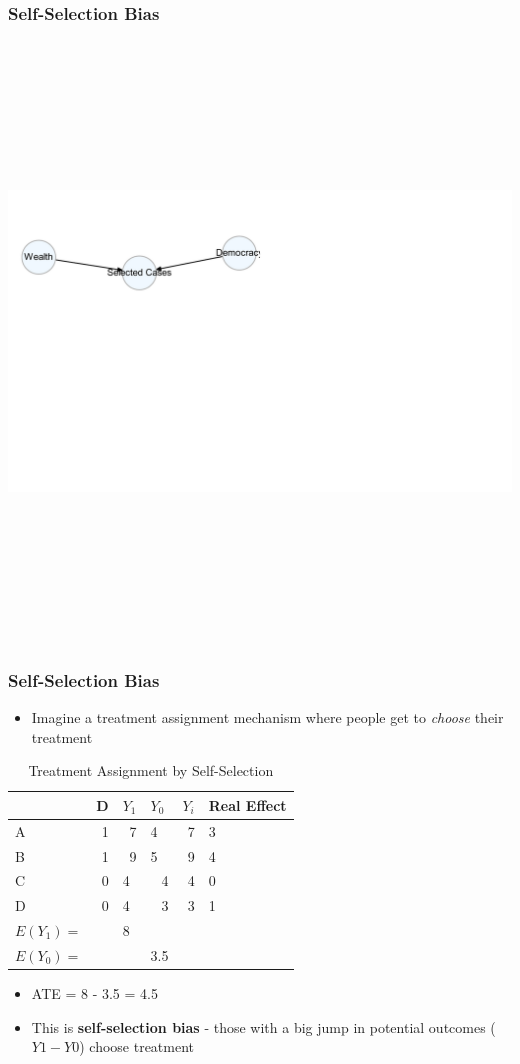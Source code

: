\documentclass[xcolor=x11names,compress]{beamer}\usepackage[]{graphicx}\usepackage[]{color}
\newenvironment{knitrout}{}{} %
\renewcommand{\(}{\begin{columns}}
\renewcommand{\)}{\end{columns}}
\newcommand{\<}[1]{\begin{column}{#1}}
\renewcommand{\>}{\end{column}}
\begin{document}
\begin{frame}
\frametitle{Self-Selection Bias}
\begin{knitrout}
\color{fgcolor}

{\centering \includegraphics[width=600,height=600]{figure/unnamed-chunk-4-1} 

}



\end{knitrout}
\end{frame}


\begin{frame}
\frametitle{Self-Selection Bias}
\begin{itemize}
\item Imagine a treatment assignment mechanism where people get to \textit{choose} their treatment
\end{itemize}
\begin{table}[htbp]
  \centering
  \caption{Treatment Assignment by Self-Selection}
    \begin{tabular}{|l|r|l|r|r|l|}
    \hline
          & \multicolumn{1}{l|}{D} & $Y_1$  & \multicolumn{1}{l|}{$Y_0$} & \multicolumn{1}{l|}{$Y_i$} & Real Effect \bigstrut\\
    \hline
    A     & 1     & \multicolumn{1}{r|}{\cellcolor{teal}7} & \multicolumn{1}{l|}{4} & 7     & 3 \bigstrut\\
    \hline
    B     & 1     & \multicolumn{1}{r|}{\cellcolor{teal}9} & \multicolumn{1}{l|}{5} & 9     & 4 \bigstrut\\
    \hline
    C     & 0     & 4     & \cellcolor{teal}4     & 4     & 0 \bigstrut\\
    \hline
    D     & 0     & 4     & \cellcolor{teal}3     & 3     & 1 \bigstrut\\
    \hline \pause
    $E(Y_1)=$ & & 8 & & \bigstrut\\
    \hline
    $E(Y_0)=$ & &  & 3.5 & \bigstrut\\
    \hline
    \end{tabular}%
\end{table}%
\begin{itemize}
\pause
\item ATE = 8 - 3.5 = 4.5
\item This is \textbf{self-selection bias} - those with a big jump in potential outcomes ($Y1 - Y0$) choose treatment
\end{itemize}
\end{frame}
\end{document}
